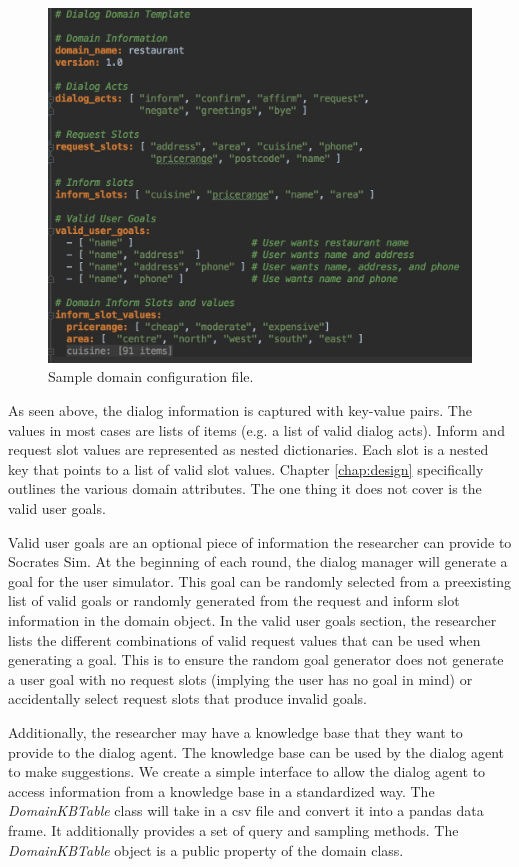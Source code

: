 \begin{figure}[h!]
	\centering
	\includegraphics[scale=.25]{diagrams/sample_domain.jpeg}
	\caption{ Sample domain configuration file. }
	\label{fig:sample_domain}
\end{figure}

As seen above, the dialog information is captured with key-value pairs. The values in most cases are lists of items (e.g. a list of valid dialog acts). Inform and request slot values are represented as nested dictionaries. Each slot is a nested key that points to a list of valid slot values. Chapter \ref{chap:design} specifically outlines the various domain attributes. The one thing it does not cover is the valid user goals. 

Valid user goals are an optional piece of information the researcher can provide to Socrates Sim. At the beginning of each round, the dialog manager will generate a goal for the user simulator. This goal can be randomly selected from a preexisting list of valid goals or randomly generated from the request and inform slot information in the domain object. In the valid user goals section, the researcher lists the different combinations of valid request values that can be used when generating a goal. This is to ensure the random goal generator does not generate a user goal with no request slots (implying the user has no goal in mind) or accidentally select request slots that produce invalid goals.  

Additionally, the researcher may have a knowledge base that they want to provide to the dialog agent. The knowledge base can be used by the dialog agent to make suggestions. We create a simple interface to allow the dialog agent to access information from a knowledge base in a standardized way. The \textit{DomainKBTable} class will take in a csv file and convert it into a pandas data frame. It additionally provides a set of query and sampling methods. The \textit{DomainKBTable} object is a public property of the domain class.

